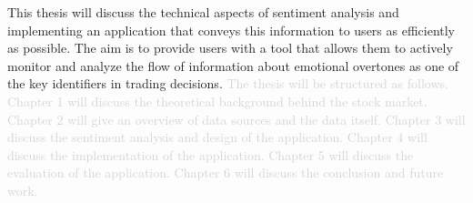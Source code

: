 
This thesis will discuss the technical aspects of sentiment analysis and implementing an application that conveys this information to users as efficiently as possible. The aim is to provide users with a tool that allows them to actively monitor and analyze the flow of information about emotional overtones as one of the key identifiers in trading decisions. \textcolor{lightgray}{The thesis will be structured as follows. Chapter 1 will discuss the theoretical background behind the stock market. Chapter 2 will give an overview of data sources and the data itself. Chapter 3 will discuss the sentiment analysis and design of the application. Chapter 4 will discuss the implementation of the application. Chapter 5 will discuss the evaluation of the application. Chapter 6 will discuss the conclusion and future work.}

